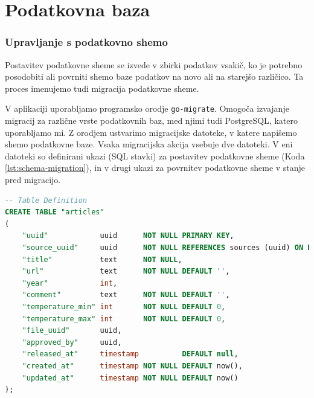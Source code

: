 \documentclass[a4paper, 12pt]{book}
\begin{document}
\section{Podatkovna baza }

\subsubsection{Upravljanje s podatkovno shemo}
Postavitev podatkovne sheme se izvede v zbirki podatkov vsakič, ko je potrebno posodobiti ali povrniti shemo baze podatkov na novo ali na starejšo različico. Ta proces imenujemo tudi migracija podatkovne sheme.

V aplikaciji uporabljamo programsko orodje \verb=go-migrate=. Omogoča izvajanje migracij za različne vrste podatkovnih baz, med njimi tudi PostgreSQL, katero uporabljamo mi. Z orodjem ustvarimo migracijske datoteke, v katere napišemo shemo podatkovne baze. Vsaka migracijska akcija vsebuje dve datoteki. V eni datoteki so definirani ukazi (SQL stavki) za postavitev podatkovne sheme (Koda \ref{lst:schema-migration}), in v drugi ukazi za  povrnitev podatkovne sheme v stanje pred migracijo.


\begin{lstlisting}[language=sql, style=mystyle,caption={Izsek koda, za kreiranje tabele "articles", namenjeno hranjenju podatkov o publikacijah.},label=lst:schema-migration]
-- Table Definition
CREATE TABLE "articles"
(
    "uuid"            uuid      NOT NULL PRIMARY KEY,
    "source_uuid"     uuid      NOT NULL REFERENCES sources (uuid) ON DELETE CASCADE,
    "title"           text      NOT NULL,
    "url"             text      NOT NULL DEFAULT '',
    "year"            int,
    "comment"         text      NOT NULL DEFAULT '',
    "temperature_min" int       NOT NULL DEFAULT 0,
    "temperature_max" int       NOT NULL DEFAULT 0,
    "file_uuid"       uuid,
    "approved_by"     uuid,
    "released_at"     timestamp          DEFAULT null,
    "created_at"      timestamp NOT NULL DEFAULT now(),
    "updated_at"      timestamp NOT NULL DEFAULT now()
);
\end{lstlisting}

\end{document}
